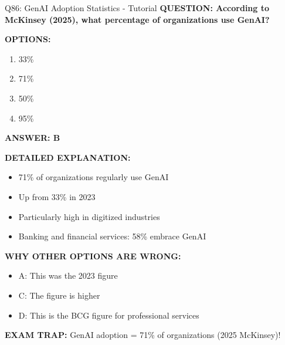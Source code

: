 \documentclass[8pt]{beamer}
\begin{document}
	\begin{frame}{Q86: GenAI Adoption Statistics - Tutorial}
		\fontsize{6.5}{7.5}\selectfont
		\textbf{QUESTION: According to McKinsey (2025), what percentage of organizations use GenAI?}
		
		\vspace{0.1cm}
		\textbf{OPTIONS:}
		\begin{enumerate}
			\item 33\%
			\item 71\%
			\item 50\%
			\item 95\%
		\end{enumerate}
		
		\vspace{0.1cm}
		\textcolor{myblue}{\textbf{ANSWER: B}}
		
		\vspace{0.1cm}
		\textbf{DETAILED EXPLANATION:}
		\begin{itemize}
			\item 71\% of organizations regularly use GenAI
			\item Up from 33\% in 2023
			\item Particularly high in digitized industries
			\item Banking and financial services: 58\% embrace GenAI
		\end{itemize}
		
		\vspace{0.1cm}
		\textcolor{myred}{\textbf{WHY OTHER OPTIONS ARE WRONG:}}
		\begin{itemize}
			\item \textcolor{myred}{A:} This was the 2023 figure
			\item \textcolor{myred}{C:} The figure is higher
			\item \textcolor{myred}{D:} This is the BCG figure for professional services
		\end{itemize}
		
		\textcolor{myred}{\textbf{EXAM TRAP:}} GenAI adoption = \textcolor{myblue}{71\% of organizations} (2025 McKinsey)!
	\end{frame}
	
\end{document}
